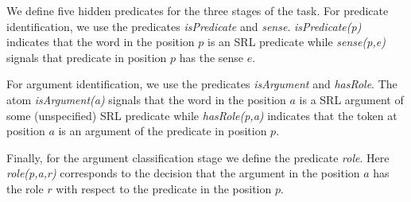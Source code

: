 


We define five hidden predicates for the three stages of the task. %
For predicate identification, we use the predicates \emph{isPredicate} and \emph{sense}. \emph{isPredicate(p)} indicates that the word in the position $p$ is an SRL predicate while \emph{sense(p,e)} signals that predicate in position $p$ has the sense $e$. %

For argument identification, we use the predicates \emph{isArgument} and \emph{hasRole}. The atom \emph{isArgument(a)} signals that the word in the position $a$ is a SRL argument of some (unspecified) SRL predicate while \emph{hasRole(p,a)} indicates that the token at position $a$ is an argument of the predicate in position $p$. 

Finally, for the argument classification stage we define the predicate
\emph{role}. Here \emph{role(p,a,r)} corresponds to the decision that the
argument in the position $a$ has the role $r$ with respect to the predicate in
the position $p$.




